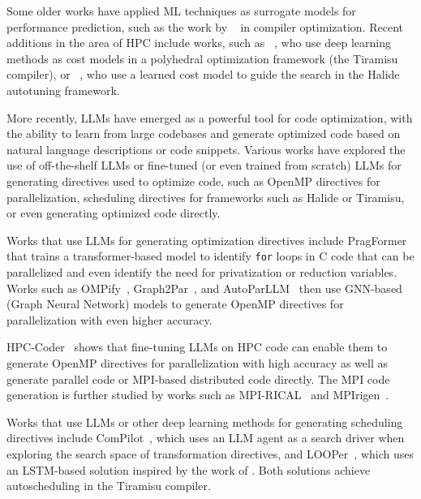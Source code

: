 Some older works have applied ML techniques as surrogate models for performance prediction, such as the work by \citeauthor{fursin2011milepost}~\cite{fursin2011milepost} in compiler optimization. Recent additions in the area of HPC include works, such as \citeauthor{baghdadi2021deep}~\cite{baghdadi2021deep}, who use deep learning methods as cost models in a polyhedral optimization framework (the Tiramisu compiler), or \citeauthor{adams2019learning}~\cite{adams2019learning}, who use a learned cost model to guide the search in the Halide autotuning framework.

More recently, LLMs have emerged as a powerful tool for code optimization, with the ability to learn from large codebases and generate optimized code based on natural language descriptions or code snippets. Various works have explored the use of off-the-shelf LLMs or fine-tuned (or even trained from scratch) LLMs for generating directives used to optimize code, such as OpenMP directives for parallelization, scheduling directives for frameworks such as Halide or Tiramisu, or even generating optimized code directly.

Works that use LLMs for generating optimization directives include PragFormer~\cite{harel2025pragformer} that trains a transformer-based model to identify \lstinline{for} loops in C code that can be parallelized and even identify the need for privatization or reduction variables. Works such as OMPify~\cite{kadosh2023advising}, Graph2Par~\cite{chen2023learning}, and AutoParLLM~\cite{mahmud2023autoparllm} then use GNN-based (Graph Neural Network) models to generate OpenMP directives for parallelization with even higher accuracy.

HPC-Coder~\cite{nichols2024hpc} shows that fine-tuning LLMs on HPC code can enable them to generate OpenMP directives for parallelization with high accuracy as well as generate parallel code or MPI-based distributed code directly. The MPI code generation is further studied by works such as MPI-RICAL~\cite{schneider2023mpi} and MPI{rigen}~\cite{schneider2024mpirigen}.

Works that use LLMs or other deep learning methods for generating scheduling directives include ComPilot~\cite{merouani2025agentic}, which uses an LLM agent as a search driver when exploring the search space of transformation directives, and LOOPer~\cite{merouani2025looper}, which uses an LSTM-based solution inspired by the work of \citeauthor{baghdadi2021deep}. Both solutions achieve autoscheduling in the Tiramisu compiler.

